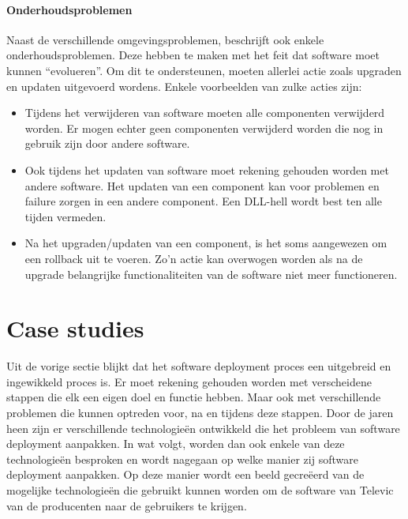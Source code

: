 \paragraph{Onderhoudsproblemen}
Naast de verschillende omgevingsproblemen, beschrijft \citet{dolstra2006purely} ook enkele onderhoudsproblemen.
Deze hebben te maken met het feit dat software moet kunnen ``evolueren''.
Om dit te ondersteunen, moeten allerlei actie zoals upgraden en updaten uitgevoerd wordens.
Enkele voorbeelden van zulke acties zijn:
\begin{itemize}
\item Tijdens het verwijderen van software moeten alle componenten verwijderd worden.
Er mogen echter geen componenten verwijderd worden die nog in gebruik zijn door andere software.
\item Ook tijdens het updaten van software moet rekening gehouden worden met andere software.
Het updaten van een component kan voor problemen en failure zorgen in een andere component.
Een DLL-hell wordt best ten alle tijden vermeden.
\item Na het upgraden/updaten van een component, is het soms aangewezen om een rollback uit te voeren.
Zo'n actie kan overwogen worden als na de upgrade belangrijke functionaliteiten van de software niet meer functioneren.
\end{itemize}

\section{Case studies}\label{sec:caseStudies}
Uit de vorige sectie blijkt dat het software deployment proces een uitgebreid en ingewikkeld proces is.
Er moet rekening gehouden worden met verscheidene stappen die elk een eigen doel en functie hebben.
Maar ook met verschillende problemen die kunnen optreden voor, na en tijdens deze stappen.
Door de jaren heen zijn er verschillende technologieën ontwikkeld die het probleem van software deployment aanpakken.
In wat volgt, worden dan ook enkele van deze technologieën besproken en wordt nagegaan op welke manier zij software deployment aanpakken.
Op deze manier wordt een beeld gecreëerd van de mogelijke technologieën die gebruikt kunnen worden om de software van Televic van de producenten naar de gebruikers te krijgen.

